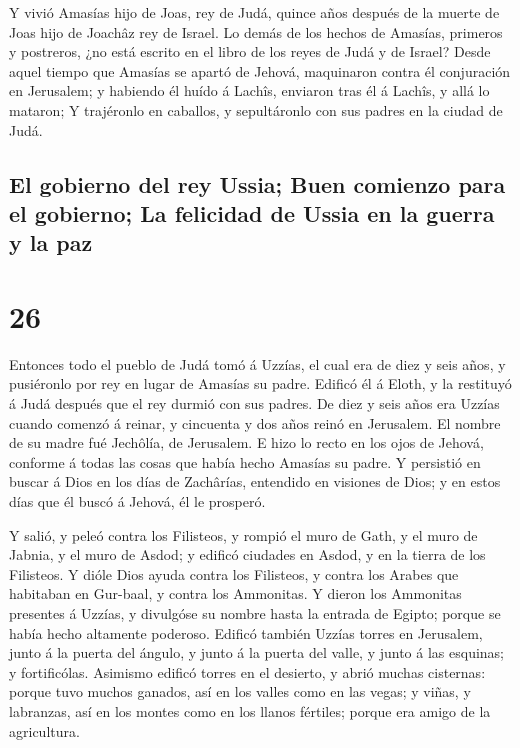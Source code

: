  Y vivió Amasías hijo de Joas, rey de Judá, quince años
después de la muerte de Joas hijo de Joachâz rey de Israel.
 Lo demás de los hechos de Amasías, primeros y postreros,
¿no está escrito en el libro de los reyes de Judá y de Israel?
 Desde aquel tiempo que Amasías se apartó de Jehová,
maquinaron contra él conjuración en Jerusalem; y habiendo él huído á
Lachîs, enviaron tras él á Lachîs, y allá lo mataron;  Y
trajéronlo en caballos, y sepultáronlo con sus padres en la ciudad de
Judá.

\hypertarget{el-gobierno-del-rey-ussia-buen-comienzo-para-el-gobierno-la-felicidad-de-ussia-en-la-guerra-y-la-paz}{%
\subsection{El gobierno del rey Ussia; Buen comienzo para el gobierno;
La felicidad de Ussia en la guerra y la
paz}\label{el-gobierno-del-rey-ussia-buen-comienzo-para-el-gobierno-la-felicidad-de-ussia-en-la-guerra-y-la-paz}}

\hypertarget{section-25}{%
\section{26}\label{section-25}}

 Entonces todo el pueblo de Judá tomó á Uzzías, el cual era
de diez y seis años, y pusiéronlo por rey en lugar de Amasías su padre.
 Edificó él á Eloth, y la restituyó á Judá después que el
rey durmió con sus padres.  De diez y seis años era Uzzías
cuando comenzó á reinar, y cincuenta y dos años reinó en Jerusalem. El
nombre de su madre fué Jechôlía, de Jerusalem.  E hizo lo
recto en los ojos de Jehová, conforme á todas las cosas que había hecho
Amasías su padre.  Y persistió en buscar á Dios en los días
de Zachârías, entendido en visiones de Dios; y en estos días que él
buscó á Jehová, él le prosperó.

 Y salió, y peleó contra los Filisteos, y rompió el muro de
Gath, y el muro de Jabnia, y el muro de Asdod; y edificó ciudades en
Asdod, y en la tierra de los Filisteos.  Y dióle Dios ayuda
contra los Filisteos, y contra los Arabes que habitaban en Gur-baal, y
contra los Ammonitas.  Y dieron los Ammonitas presentes á
Uzzías, y divulgóse su nombre hasta la entrada de Egipto; porque se
había hecho altamente poderoso.  Edificó también Uzzías
torres en Jerusalem, junto á la puerta del ángulo, y junto á la puerta
del valle, y junto á las esquinas; y fortificólas. 
Asimismo edificó torres en el desierto, y abrió muchas cisternas: porque
tuvo muchos ganados, así en los valles como en las vegas; y viñas, y
labranzas, así en los montes como en los llanos fértiles; porque era
amigo de la agricultura.

